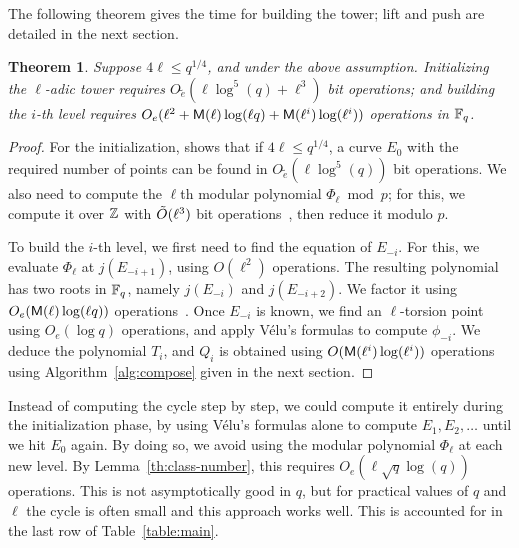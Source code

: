\documentclass{sig-alternate}
\newtheorem{theorem}[definition]{Theorem}
\begin{document}
The following theorem gives the time for building the tower; lift and
push are detailed in the next section. 

\begin{theorem}\label{theo:elliptic}
  \sloppy
  Suppose $4\ell\le q^{1/4}$, and under the above assumption.
  Initializing the $\ell$-adic tower requires
  $O\tilde{_e}(\ell\log^5(q)+\ell^3)$ bit operations; and building the
  $i$-th level requires $O_e(\ell^2+\mathsf{M}(\ell)\log(\ell
  q)+\mathsf{M}(\ell^i)\log(\ell^i))$ operations in $\mathbb{F}_q$.
\end{theorem}
\begin{proof}
  For the initialization, \cite[\S~4.3]{couveignes+lercier11}
  shows that if $4\ell\le q^{1/4}$, a curve $E_0$ with the required
  number of points can be found in $O\tilde{_e}(\ell\log^5(q))$ bit
  operations. We also need to compute the $\ell$th modular polynomial
  $\Phi_\ell\bmod p$; for this, we compute it over $\mathbb{Z}$ with
  $\tilde{O}(\ell^3)$ bit operations~\cite{enge09}, then reduce it
  modulo $p$.

  To build the $i$-th level, we first need to find the equation of
  $E_{-i}$. For this, we evaluate $\Phi_\ell$ at $j(E_{-i+1})$, using
  $O(\ell^2)$ operations. The resulting polynomial has two roots in
  $\mathbb{F}_q$, namely $j(E_{-i})$ and $j(E_{-i+2})$. We factor it using
  $O_e(\mathsf{M}(\ell)\log(\ell q))$ operations~\cite[Ch~14]{vzGG}. Once
  $E_{-i}$ is known, we find an $\ell$-torsion point using $O_e(\log
  q)$ operations, and apply Vélu's formulas to compute $\phi_{-i}$. We
  deduce the polynomial $T_i$, and $Q_i$ is obtained using
  $O(\mathsf{M}(\ell^i)\log(\ell^i))$ operations using
  Algorithm~\ref{alg:compose} given in the next section.
\end{proof}

\begin{remark}
  \label{rk:elliptic}
  Instead of computing the cycle step by step, we could compute it
  entirely during the initialization phase, by using Vélu's formulas
  alone to compute $E_1,E_2,\dots$ until we hit $E_0$ again. By doing
  so, we avoid using the modular polynomial $\Phi_\ell$ at each new
  level. By Lemma~\ref{th:class-number}, this requires
  $O_e(\ell\sqrt{q}\log(q))$ operations. This is not asymptotically good
  in $q$, but for practical values of $q$ and $\ell$ the cycle is often
  small and this approach works well. This is accounted for in the last
  row of Table~\ref{table:main}.  
\end{remark}

\end{document}
